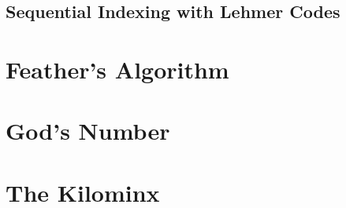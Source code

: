 \subsection{Sequential Indexing with Lehmer Codes}

\section{Feather's Algorithm}

\section{God's Number}

\section{The Kilominx}
